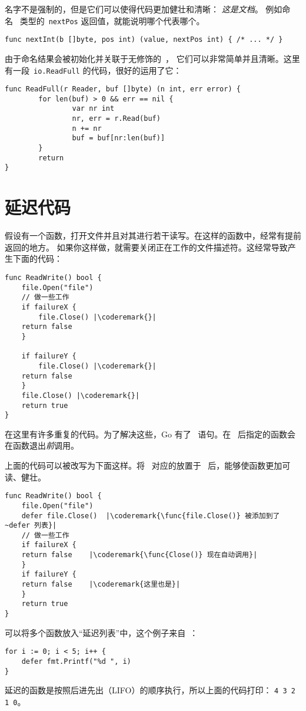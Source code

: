 名字不是强制的，但是它们可以使得代码更加健壮和清晰：
\emph{这是文档}。
例如命名~ 类型的~\lstinline{nextPos} 返回值，就能说明哪个代表哪个。
\begin{lstlisting}
func nextInt(b []byte, pos int) (value, nextPos int) { /* ... */ }
\end{lstlisting}

由于命名结果会被初始化并关联于无修饰的~，
它们可以非常简单并且清晰。这里有一段~\lstinline{io.ReadFull} 的代码，很好的运用了它：

\begin{lstlisting}
func ReadFull(r Reader, buf []byte) (n int, err error) {
        for len(buf) > 0 && err == nil {
                var nr int
                nr, err = r.Read(buf)
                n += nr
                buf = buf[nr:len(buf)]
        }
        return
}
\end{lstlisting}

\section{延迟代码}
\label{sec:deferred code}
假设有一个函数，打开文件并且对其进行若干读写。在这样的函数中，经常有提前返回的地方。
如果你这样做，就需要关闭正在工作的文件描述符。这经常导致产生下面的代码：
\begin{lstlisting}[caption=没有 defer]
func ReadWrite() bool {
    file.Open("file")
    // 做一些工作
    if failureX {
        file.Close() |\coderemark{}|
	return false
    }

    if failureY {
        file.Close() |\coderemark{}|
	return false
    }
    file.Close() |\coderemark{}|
    return true
}
\end{lstlisting}
在这里有许多重复的代码。为了解决这些，Go 有了~ 
语句。在~ 后指定的函数会在函数退出\emph{前}调用。

上面的代码可以被改写为下面这样。将~ 对应的放置于~ 
后，能够使函数更加可读、健壮。
\begin{lstlisting}[caption=With defer]
func ReadWrite() bool {
    file.Open("file")
    defer file.Close()	|\coderemark{\func{file.Close()} 被添加到了~defer 列表}|
    // 做一些工作
    if failureX {
	return false    |\coderemark{\func{Close()} 现在自动调用}|
    }
    if failureY {
	return false    |\coderemark{这里也是}|
    }
    return true
}
\end{lstlisting}

可以将多个函数放入``延迟列表''中，这个例子来自~\cite{effective_go}：
\begin{lstlisting}
for i := 0; i < 5; i++ { 
    defer fmt.Printf("%d ", i) 
} 
\end{lstlisting}
延迟的函数是按照后进先出（LIFO）的顺序执行，所以上面的代码打印：
\lstinline{4 3 2 1 0}。

